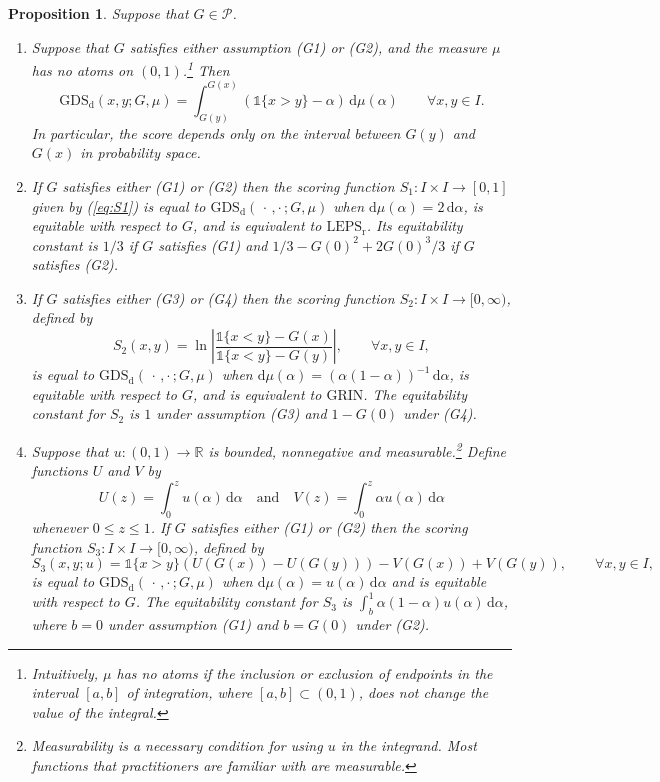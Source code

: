 \documentclass[10pt,a4paper]{amsart}
\newtheorem{prop}{Proposition}
\newcommand{\GDSd}{\mathrm{GDS}_\mathrm{d}}
\newcommand{\Grin}{\mathrm{GRIN}}
\newcommand{\LEPSr}{\mathrm{LEPS}_\mathrm{r}}
\newcommand{\RRR}{\mathbb{R}}
\newcommand{\dd}{\mathrm{d}}
\newcommand{\one}{\mathds{1}}
\newcommand{\twocdots}{\,\cdot\,,\cdot\,}
\begin{document}
\begin{prop}\label{prop:real valued equitable scores}
Suppose that $G\in\mathcal{P}$.
\begin{enumerate}
\item[(i)] Suppose that $G$ satisfies either assumption (G1) or (G2), and the measure $\mu$ has no atoms on $(0,1)$.\footnote{Intuitively, $\mu$ has no atoms if the inclusion or exclusion of endpoints in the interval $[a,b]$ of integration, where $[a,b]\subset(0,1)$, does not change the value of the integral.} Then
\begin{equation}\label{eq:GDSd reduced}
\GDSd(x,y;G,\mu) = \int_{G(y)}^{G(x)}(\one\{x>y\} - \alpha)\,\dd\mu(\alpha) \qquad\forall x,y\in I.
\end{equation}
In particular, the score depends only on the interval between $G(y)$ and $G(x)$ in probability space.
\item[(ii)] If $G$ satisfies either (G1) or (G2) then the scoring function $S_1:I \times I\to[0,1]$ given by (\ref{eq:S1}) is equal to $\GDSd(\twocdots;G,\mu)$ when $\dd\mu(\alpha)=2\,\dd\alpha$, is equitable with respect to $G$, and is equivalent to $\LEPSr$. Its equitability constant is $1/3$ if $G$ satisfies (G1) and $1/3-G(0)^2+2G(0)^3/3$ if  $G$ satisfies (G2).
\item[(iii)] If $G$ satisfies either (G3) or (G4) then the scoring function $S_2: I\times I\to[0,\infty)$, defined by
\begin{equation}\label{eq:S2}
S_2(x,y)=\ln\left|\frac{\one\{x < y\} - G(x)}{\one\{x < y\} - G(y)}\right|, \qquad \forall x,y\in I,
\end{equation}
is equal to $\GDSd(\twocdots;G,\mu)$ when $\dd\mu(\alpha) = (\alpha(1-\alpha))^{-1}\,\dd\alpha$, is equitable with respect to $G$, and is equivalent to $\Grin$. The equitability constant for $S_2$ is $1$ under assumption (G3) and $1-G(0)$ under (G4).
\item[(iv)] Suppose that $u:(0,1)\to\RRR$ is bounded, nonnegative and measurable.\footnote{Measurability is a necessary condition for using $u$ in the integrand. Most functions that practitioners are familiar with are measurable.} Define functions $U$ and $V$ by
\[U(z)=\int_0^z u(\alpha)\,\dd\alpha \quad\text{and}\quad V(z)=\int_0^z \alpha u(\alpha)\,\dd\alpha\]
whenever $0\leq z \leq 1$. If $G$ satisfies either (G1) or (G2) then the scoring function $S_3:I \times I\to[0,\infty)$, defined by
\begin{equation}
S_3(x,y;u)= \one\{x>y\}(U(G(x)) - U(G(y))) - V(G(x)) + V(G(y)), \qquad \forall x,y\in I,
\end{equation}
is equal to $\GDSd(\twocdots;G,\mu)$ when $\dd\mu(\alpha)=u(\alpha)\,\dd\alpha$ and is equitable with respect to $G$. The equitability constant for $S_3$ is $\int_b^1 \alpha(1-\alpha)u(\alpha)\,\dd\alpha$, where $b=0$ under assumption (G1) and $b=G(0)$ under (G2).
\end{enumerate}
\end{prop} 
\end{document}
